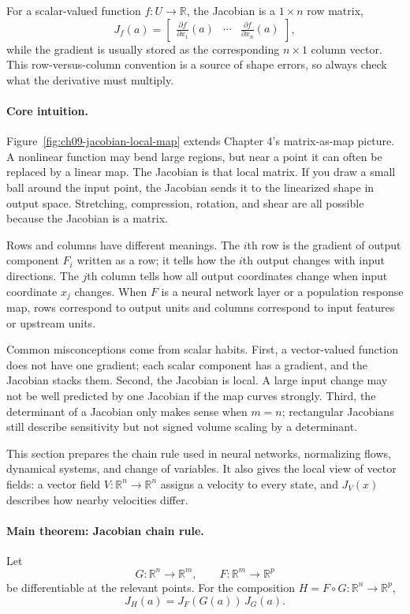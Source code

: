 For a scalar-valued function \(f:U\to\mathbb{R}\), the Jacobian is a \(1\times n\) row matrix,
\[
J_f(a)=
\begin{bmatrix}
\frac{\partial f}{\partial x_1}(a)&\cdots&\frac{\partial f}{\partial x_n}(a)
\end{bmatrix},
\]
while the gradient is usually stored as the corresponding \(n\times1\) column vector. This row-versus-column convention is a source of shape errors, so always check what the derivative must multiply.

\paragraph{Core intuition.}
Figure~\ref{fig:ch09-jacobian-local-map} extends Chapter 4's matrix-as-map picture. A nonlinear function may bend large regions, but near a point it can often be replaced by a linear map. The Jacobian is that local matrix. If you draw a small ball around the input point, the Jacobian sends it to the linearized shape in output space. Stretching, compression, rotation, and shear are all possible because the Jacobian is a matrix.

Rows and columns have different meanings. The \(i\)th row is the gradient of output component \(F_i\) written as a row; it tells how the \(i\)th output changes with input directions. The \(j\)th column tells how all output coordinates change when input coordinate \(x_j\) changes. When \(F\) is a neural network layer or a population response map, rows correspond to output units and columns correspond to input features or upstream units.

Common misconceptions come from scalar habits. First, a vector-valued function does not have one gradient; each scalar component has a gradient, and the Jacobian stacks them. Second, the Jacobian is local. A large input change may not be well predicted by one Jacobian if the map curves strongly. Third, the determinant of a Jacobian only makes sense when \(m=n\); rectangular Jacobians still describe sensitivity but not signed volume scaling by a determinant.

This section prepares the chain rule used in neural networks, normalizing flows, dynamical systems, and change of variables. It also gives the local view of vector fields: a vector field \(V:\mathbb{R}^n\to\mathbb{R}^n\) assigns a velocity to every state, and \(J_V(x)\) describes how nearby velocities differ.

\paragraph{Main theorem: Jacobian chain rule.}
Let
\[
G:\mathbb{R}^n\to\mathbb{R}^m,
\qquad
F:\mathbb{R}^m\to\mathbb{R}^p
\]
be differentiable at the relevant points. For the composition \(H=F\circ G:\mathbb{R}^n\to\mathbb{R}^p\),
\[
J_H(a)=J_F(G(a))\,J_G(a).
\]


